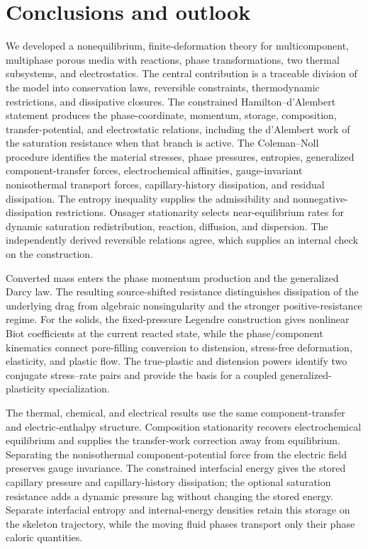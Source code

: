 \section{Conclusions and outlook}
\label{sec:conclusions}

We developed a nonequilibrium, finite-deformation theory for
multicomponent, multiphase porous media with reactions, phase
transformations, two thermal subsystems, and electrostatics.  The central
contribution is a traceable division of the model into conservation laws,
reversible constraints, thermodynamic restrictions, and dissipative closures.
The constrained Hamilton--d'Alembert statement produces the phase-coordinate,
momentum, storage, composition, transfer-potential, and electrostatic
relations, including the d'Alembert work of the saturation resistance when
that branch is active.  The Coleman--Noll procedure identifies the material
stresses, phase pressures, entropies, generalized component-transfer forces,
electrochemical affinities, gauge-invariant nonisothermal transport forces,
capillary-history dissipation, and residual dissipation.  The entropy
inequality supplies the admissibility and nonnegative-dissipation restrictions.
Onsager stationarity selects near-equilibrium rates for dynamic saturation
redistribution, reaction, diffusion, and dispersion.  The independently
derived reversible relations agree, which supplies an internal check on the
construction.

Converted mass enters the phase momentum production and the generalized Darcy
law.  The resulting source-shifted resistance distinguishes dissipation of the
underlying drag from algebraic nonsingularity and the stronger
positive-resistance regime.  For the solids, the fixed-pressure Legendre
construction gives nonlinear Biot coefficients at the current reacted state,
while the phase/component kinematics connect pore-filling conversion to
distension, stress-free deformation, elasticity, and plastic flow.  The
true-plastic and distension powers identify two conjugate stress--rate pairs and
provide the basis for a coupled generalized-plasticity specialization.

The thermal, chemical, and electrical results use the same component-transfer
and electric-enthalpy structure.  Composition stationarity recovers
electrochemical equilibrium and supplies the transfer-work correction away
from equilibrium.  Separating the nonisothermal component-potential force from
the electric field preserves gauge invariance.  The constrained interfacial
energy gives the stored capillary pressure and capillary-history dissipation;
the optional saturation resistance adds a dynamic pressure lag without changing
the stored energy.  Separate interfacial entropy and internal-energy densities
retain this storage on the skeleton trajectory, while the moving fluid phases
transport only their phase caloric quantities.

